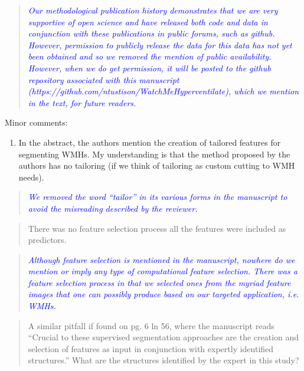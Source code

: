 \documentclass[12pt,]{article}
\providecommand{\tightlist}{%
  \setlength{\itemsep}{0pt}\setlength{\parskip}{0pt}}
\begin{document}
\begin{quote}
\emph{\textcolor{blue}{Our methodological publication history demonstrates that we are
very supportive of open science and have released both code and data in conjunction
with these publications in public forums, such as github.  However, permission to
publicly release the data for this data has not yet been obtained and so we removed
the mention of public availability.  However, when we do get permission, it will
be posted to the github repository associated with this manuscript
(https://github.com/ntustison/WatchMeHyperventilate), which we mention in the text,
for future readers.
}}
\end{quote}

Minor comments:

\begin{enumerate}
\def\labelenumi{\arabic{enumi}.}
\setcounter{enumi}{4}
\tightlist
\item
  In the abstract, the authors mention the creation of tailored features
  for segmenting WMHs. My understanding is that the method proposed by
  the authors has no tailoring (if we think of tailoring as custom
  cutting to WMH needs).
\end{enumerate}

\begin{quote}
\emph{\textcolor{blue}{We removed the word ``tailor'' in its various forms in the
manuscript to avoid the misreading described by the reviewer.}}
\end{quote}

\begin{quote}
There was no feature selection process all the features were included as
predictors.
\end{quote}

\begin{quote}
\emph{\textcolor{blue}{Although feature selection is mentioned in the manuscript, nowhere
do we mention or imply any type of computational feature selection.  There was
a feature selection process in that we selected ones from the myriad feature images that
one can possibly produce based on our targeted application, i.e. WMHs.}}
\end{quote}

\begin{quote}
A similar pitfall if found on pg. 6 ln 56, where the manuscript reads
``Crucial to these supervised segmentation approaches are the creation
and selection of features as input in conjunction with expertly
identified structures.'' What are the structures identified by the
expert in this study?
\end{quote}
\end{document}
